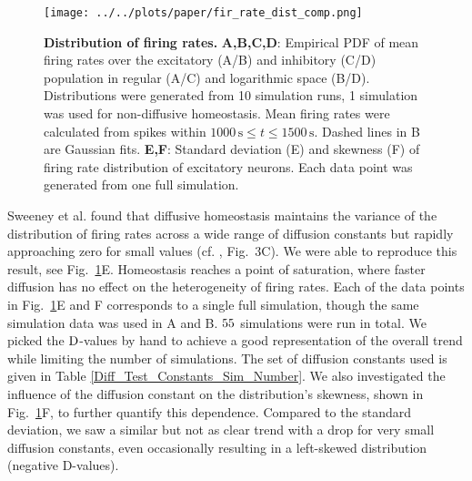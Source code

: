\documentclass[10pt,letterpaper]{article}
\begin{document}
\begin{figure}
\begin{center}
\texttt{[image: ../../plots/paper/fir\_rate\_dist\_comp.png]}
\end{center}
\caption{{\bf Distribution of firing rates.} \textbf{A,B,C,D}: Empirical PDF of mean firing rates over the excitatory (A/B) and inhibitory (C/D) population in regular (A/C) and logarithmic space (B/D). Distributions were generated from 10 simulation runs, 1 simulation was used for non-diffusive homeostasis. Mean firing rates were calculated from spikes within $\mathrm{1000\,s} \leq t  \mathrm{\leq 1500\,s}$. Dashed lines in B are Gaussian fits. \textbf{E,F}: Standard deviation (E) and skewness (F) of firing rate distribution of excitatory neurons. Each data point was generated from one full simulation.}
\label{Fir_Rate_Dist_Comp}
\end{figure}

Sweeney et al. found that diffusive homeostasis maintains the variance of the distribution of firing rates across a wide range of diffusion constants but rapidly approaching zero for small values (cf. \cite{Sweeney_Paper}, Fig.~3C). We were able to reproduce this result, see Fig.~\ref{Fir_Rate_Dist_Comp}E. Homeostasis reaches a point of saturation, where faster diffusion has no effect on the heterogeneity of firing rates. Each of the data points in Fig.~\ref{Fir_Rate_Dist_Comp}E and F corresponds to a single full simulation, though the same simulation data was used in A and B. $\rm 55$ simulations were run in total. We picked the $\rm D$-values by hand to achieve a good representation of the overall trend while limiting the number of simulations. The set of diffusion constants used is given in Table \ref{Diff_Test_Constants_Sim_Number}.
We also investigated the influence of the diffusion constant on the distribution's skewness, shown in Fig.~\ref{Fir_Rate_Dist_Comp}F, to further quantify this dependence. Compared to the standard deviation, we saw a similar but not as clear trend with a drop for very small diffusion constants, even occasionally resulting in a left-skewed distribution (negative D-values).
\end{document}
